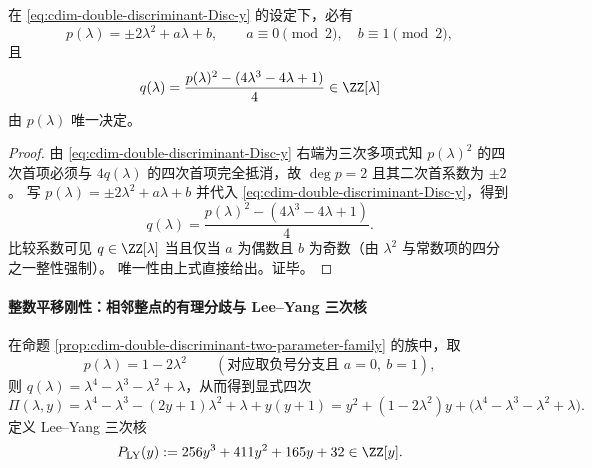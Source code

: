 \begin{proposition}[双判别同步族的二参数压缩]\label{prop:cdim-double-discriminant-two-parameter-family}
在 \eqref{eq:cdim-double-discriminant-Disc-y} 的设定下，必有
\[
p(\lambda)=\pm 2\lambda^{2}+a\lambda+b,
\qquad
a\equiv 0\pmod{2},\quad b\equiv 1\pmod{2},
\]
且
\[
q(\lambda)=\frac{p(\lambda)^{2}-(4\lambda^{3}-4\lambda+1)}{4}\in\ZZ[\lambda]
\]
由 \(p(\lambda)\) 唯一决定。
\end{proposition}
\begin{proof}
由 \eqref{eq:cdim-double-discriminant-Disc-y} 右端为三次多项式知 \(p(\lambda)^{2}\) 的四次首项必须与 \(4q(\lambda)\) 的四次首项完全抵消，故 \(\deg p=2\) 且其二次首系数为 \(\pm 2\)。
写 \(p(\lambda)=\pm 2\lambda^{2}+a\lambda+b\) 并代入 \eqref{eq:cdim-double-discriminant-Disc-y}，得到
\[
q(\lambda)=\frac{p(\lambda)^{2}-(4\lambda^{3}-4\lambda+1)}{4}.
\]
比较系数可见 \(q\in\ZZ[\lambda]\) 当且仅当 \(a\) 为偶数且 \(b\) 为奇数（由 \(\lambda^{2}\) 与常数项的四分之一整性强制）。
唯一性由上式直接给出。证毕。
\end{proof}

\paragraph{整数平移刚性：相邻整点的有理分歧与 Lee--Yang 三次核}
在命题 \ref{prop:cdim-double-discriminant-two-parameter-family} 的族中，取
\[
p(\lambda)=1-2\lambda^{2}
\qquad(\text{对应取负号分支且 }a=0,\ b=1),
\]
则 \(q(\lambda)=\lambda^{4}-\lambda^{3}-\lambda^{2}+\lambda\)，从而得到显式四次
\begin{equation}\label{eq:cdim-double-discriminant-Pi-special}
\Pi(\lambda,y)=\lambda^{4}-\lambda^{3}-(2y+1)\lambda^{2}+\lambda+y(y+1)
=y^{2}+(1-2\lambda^{2})y+\bigl(\lambda^{4}-\lambda^{3}-\lambda^{2}+\lambda\bigr).
\end{equation}
定义 Lee--Yang 三次核
\[
P_{\mathrm{LY}}(y):=256y^{3}+411y^{2}+165y+32\in\ZZ[y].
\]

